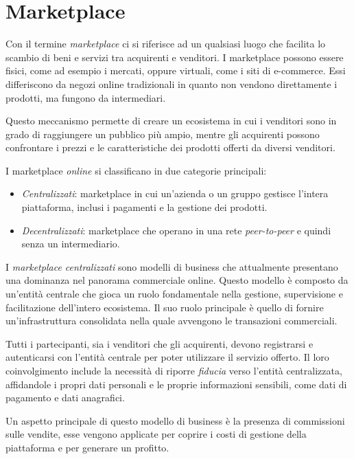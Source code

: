 \section{Marketplace}
Con il termine \textit{marketplace} ci si riferisce ad un qualsiasi luogo che facilita lo scambio di beni e servizi tra acquirenti e venditori.
I marketplace possono essere fisici, come ad esempio i mercati, oppure virtuali, come i siti di e-commerce. 
Essi differiscono da negozi online tradizionali in quanto non vendono direttamente i prodotti, ma fungono da intermediari. \cite{def-marketplace}

Questo meccanismo permette di creare un ecosistema in cui i venditori sono in grado di raggiungere un pubblico più ampio, 
mentre gli acquirenti possono confrontare i prezzi e le caratteristiche dei prodotti offerti da diversi venditori. \cite{def-marketplace}

I marketplace \textit{online} si classificano in due categorie principali: \cite{bluecart-types-of-marketplaces}

\begin{itemize}
    \item \textit{Centralizzati}: marketplace in cui un'azienda o un gruppo gestisce l'intera piattaforma, inclusi i pagamenti e la gestione dei prodotti. 
    \item \textit{Decentralizzati}: marketplace che operano in una rete \textit{peer-to-peer} e quindi senza un intermediario. 
\end{itemize}

I \textit{marketplace centralizzati} sono modelli di business che attualmente presentano una dominanza nel panorama commerciale online. Questo modello è composto da un'entità centrale che gioca un ruolo fondamentale nella gestione, supervisione e facilitazione dell'intero ecosistema. 
Il suo ruolo principale è quello di fornire un'infrastruttura consolidata nella quale avvengono le transazioni commerciali. \cite{def-centralized-marketplace}

Tutti i partecipanti, sia i venditori che gli acquirenti, devono registrarsi e autenticarsi con l'entità centrale per poter utilizzare il servizio offerto. Il loro coinvolgimento include la necessità di riporre \textit{fiducia} verso l'entità centralizzata, affidandole i propri dati personali e le proprie informazioni sensibili, come dati di pagamento e dati anagrafici. \cite{def-centralized-marketplace}

Un aspetto principale di questo modello di business è la presenza di commissioni sulle vendite, esse vengono applicate per coprire i costi di gestione della piattaforma e per generare un profitto. 

